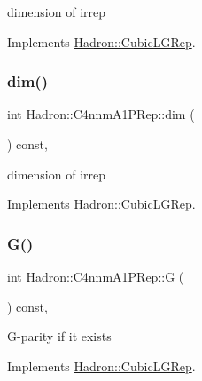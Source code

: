 dimension of irrep 

Implements \mbox{\hyperlink{structHadron_1_1CubicLGRep_a3acbaea26503ed64f20df693a48e4cdd}{Hadron\+::\+Cubic\+L\+G\+Rep}}.

\mbox{\label{structHadron_1_1C4nnmA1PRep_ad5f1c0aaa30200d50b2d1e6b9d05a0b5}} 
\subsubsection{\texorpdfstring{dim()}{dim()}\hspace{0.1cm}{\footnotesize\ttfamily [2/2]}}
{\footnotesize\ttfamily int Hadron\+::\+C4nnm\+A1\+P\+Rep\+::dim (\begin{DoxyParamCaption}{ }\end{DoxyParamCaption}) const\hspace{0.3cm}{\ttfamily [inline]}, {\ttfamily [virtual]}}

dimension of irrep 

Implements \mbox{\hyperlink{structHadron_1_1CubicLGRep_a3acbaea26503ed64f20df693a48e4cdd}{Hadron\+::\+Cubic\+L\+G\+Rep}}.

\mbox{\label{structHadron_1_1C4nnmA1PRep_aa2cf1b68b97f5403efa313215bb61fbd}} 
\subsubsection{\texorpdfstring{G()}{G()}\hspace{0.1cm}{\footnotesize\ttfamily [1/2]}}
{\footnotesize\ttfamily int Hadron\+::\+C4nnm\+A1\+P\+Rep\+::G (\begin{DoxyParamCaption}{ }\end{DoxyParamCaption}) const\hspace{0.3cm}{\ttfamily [inline]}, {\ttfamily [virtual]}}

G-\/parity if it exists 

Implements \mbox{\hyperlink{structHadron_1_1CubicLGRep_ace26f7b2d55e3a668a14cb9026da5231}{Hadron\+::\+Cubic\+L\+G\+Rep}}.

\mbox{\label{structHadron_1_1C4nnmA1PRep_aa2cf1b68b97f5403efa313215bb61fbd}} 
